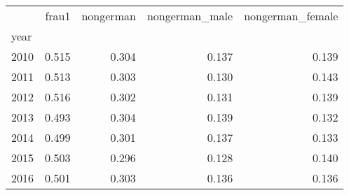 \begin{tabular}{lrrrr}
\toprule
{} &  frau1 &  nongerman &  nongerman\_male &  nongerman\_female \\
year &        &            &                 &                   \\
\midrule
2010 &  0.515 &      0.304 &           0.137 &             0.139 \\
2011 &  0.513 &      0.303 &           0.130 &             0.143 \\
2012 &  0.516 &      0.302 &           0.131 &             0.139 \\
2013 &  0.493 &      0.304 &           0.139 &             0.132 \\
2014 &  0.499 &      0.301 &           0.137 &             0.133 \\
2015 &  0.503 &      0.296 &           0.128 &             0.140 \\
2016 &  0.501 &      0.303 &           0.136 &             0.136 \\
\bottomrule
\end{tabular}

